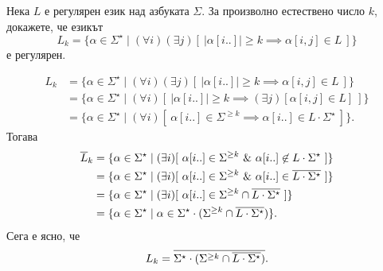 \begin{problem}
  Нека $L$ е регулярен език над азбуката $\Sigma$.
  За произволно естествено число $k$, докажете, че езикът
  \[L_k = \{ \alpha \in \Sigma^\star \mid (\forall i)(\exists j)[\ |\alpha[i..]| \geq k \implies \alpha[i,j] \in L\ ]\}\]
  е регулярен.
\end{problem}
\begin{hint}
  \begin{align*}
    L_k & = \{ \alpha \in \Sigma^\star \mid (\forall i)(\exists j)[\ |\alpha[i..]| \geq k \implies \alpha[i,j] \in L\ ]\}\\
        & = \{ \alpha \in \Sigma^\star \mid (\forall i)[\ |\alpha[i..]| \geq k \implies (\exists j)[\alpha[i,j] \in L]\ ]\}\\
        & = \{ \alpha \in \Sigma^\star \mid (\forall i)[\ \alpha[i..] \in \Sigma^{\geq k} \implies \alpha[i..] \in L \cdot \Sigma^\star\ ]\}.
  \end{align*}
  Тогава
  \begin{align*}
    \ov{L}_k & = \{ \alpha \in \Sigma^\star \mid (\exists i)[\ \alpha[i..] \in \Sigma^{\geq k}\ \&\ \alpha[i..] \not\in L \cdot \Sigma^\star\ ]\}\\
             & = \{ \alpha \in \Sigma^\star \mid (\exists i)[\ \alpha[i..] \in \Sigma^{\geq k}\ \&\ \alpha[i..] \in \ov{L \cdot \Sigma^\star}\ ]\}\\
             & = \{ \alpha \in \Sigma^\star \mid (\exists i)[\ \alpha[i..] \in \Sigma^{\geq k} \cap \ov{L \cdot \Sigma^\star} \ ]\}\\
             & = \{ \alpha \in \Sigma^\star \mid \alpha \in \Sigma^\star \cdot (\Sigma^{\geq k} \cap \ov{L \cdot \Sigma^\star}) \}.
  \end{align*}
  Сега е ясно, че
  \[L_k = \overline{\Sigma^\star \cdot (\Sigma^{\geq k} \cap \overline{L \cdot \Sigma^\star})}.\]
\end{hint}



  


